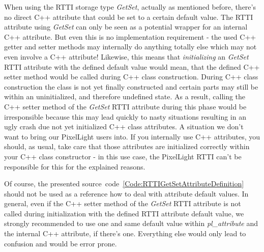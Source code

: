 When using the \ac{RTTI} storage type \emph{GetSet}, actually as mentioned before, there's no direct C++ attribute that could be set to a certain default value. The \ac{RTTI} attribute using \emph{GetSet} can only be seen as a potential wrapper for an internal C++ attribute. But even this is no implementation requirement - the used C++ getter and setter methods may internally do anything totally else which may not even involve a C++ attribute! Likewise, this means that \emph{initializing} an \emph{GetSet} \ac{RTTI} attribute with the defined default value would mean, that the defined C++ setter method would be called during C++ class construction. During C++ class construction the class is not yet finally constructed and certain parts may still be within an uninitialized, and therefore undefined state. As a result, calling the C++ setter method of the \emph{GetSet} \ac{RTTI} attribute during this phase would be irresponsible because this may lead quickly to nasty situations resulting in an ugly crash due not yet initialized C++ class attributes. A situation we don't want to bring our PixelLight users into. If you internally use C++ attributes, you should, as usual, take care that those attributes are initialized correctly within your C++ class constructor - in this use case, the PixelLight \ac{RTTI} can't be responsible for this for the explained reasons.

Of course, the presented source~code~\ref{Code:RTTIGetSetAttributeDefinition} should not be used as a reference how to deal with attribute default values. In general, even if the C++ setter method of the \emph{GetSet} \ac{RTTI} attribute is not called during initialization with the defined \ac{RTTI} attribute default value, we strongly recommended to use one and same default value within \emph{pl\_attribute} and the internal C++ attribute, if there's one. Everything else would only lead to confusion and would be error prone.


